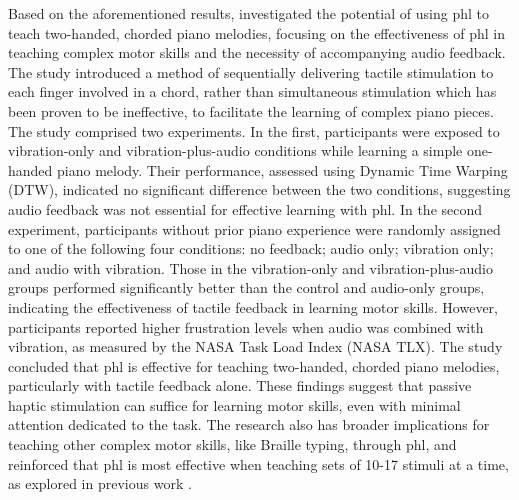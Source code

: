 Based on the aforementioned results, \cite{Seim2015b} investigated the potential of using \gls{phl} to teach two-handed, chorded piano melodies, focusing on the effectiveness of \gls{phl} in teaching complex motor skills and the necessity of accompanying audio feedback. The study introduced a method of sequentially delivering tactile stimulation to each finger involved in a chord, rather than simultaneous stimulation which has been proven to be ineffective, to facilitate the learning of complex piano pieces\cite{Luzhnica2017,Luzhnica2016,Luzhnica2018,Luzhnica2018a,Seim2014a}.
The study comprised two experiments. In the first, participants were exposed to vibration-only and vibration-plus-audio conditions while learning a simple one-handed piano melody. Their performance, assessed using Dynamic Time Warping (DTW), indicated no significant difference between the two conditions, suggesting audio feedback was not essential for effective learning with \gls{phl}.
In the second experiment, participants without prior piano experience were randomly assigned to one of the following four conditions: no feedback; audio only; vibration only; and audio with vibration. Those in the vibration-only and vibration-plus-audio groups performed significantly better than the control and audio-only groups, indicating the effectiveness of tactile feedback in learning motor skills. However, participants reported higher frustration levels when audio was combined with vibration, as measured by the NASA Task Load Index (NASA TLX).
The study concluded that \gls{phl} is effective for teaching two-handed, chorded piano melodies, particularly with tactile feedback alone. These findings suggest that passive haptic stimulation can suffice for learning motor skills, even with minimal attention dedicated to the task. The research also has broader implications for teaching other complex motor skills, like Braille typing, through \gls{phl}, and reinforced that \gls{phl} is most effective when teaching sets of 10-17 stimuli at a time, as explored in previous work \cite{Seim2014a}.

